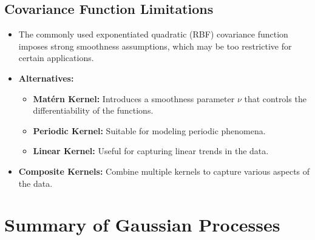 \documentclass[12pt]{article}
\begin{document}
\subsection{Covariance Function Limitations}
\begin{itemize}
    \item The commonly used exponentiated quadratic (RBF) covariance function imposes strong smoothness assumptions, which may be too restrictive for certain applications.
    \item \textbf{Alternatives:}
    \begin{itemize}
        \item \textbf{Matérn Kernel:} Introduces a smoothness parameter \( \nu \) that controls the differentiability of the functions.
        \item \textbf{Periodic Kernel:} Suitable for modeling periodic phenomena.
        \item \textbf{Linear Kernel:} Useful for capturing linear trends in the data.
    \end{itemize}
    \item \textbf{Composite Kernels:} Combine multiple kernels to capture various aspects of the data.
\end{itemize}

\section{Summary of Gaussian Processes}
\end{document}
